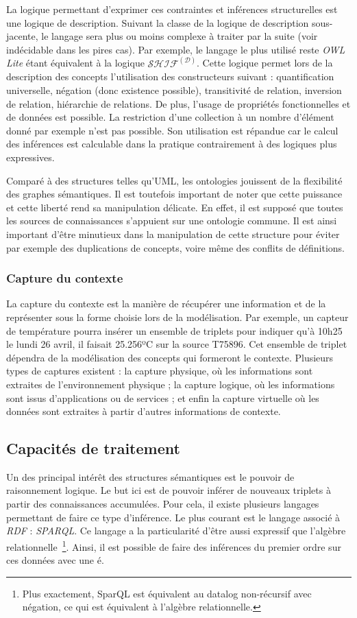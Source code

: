 La logique permettant d'exprimer ces contraintes et inférences structurelles est une logique de description. Suivant la classe de la logique de description sous-jacente, le langage sera plus ou moins complexe à traiter par la suite (voir indécidable dans les pires cas). Par exemple, le langage le plus utilisé reste \textit{OWL Lite} étant équivalent à la logique $\mathcal{SHIF}^\mathcal{(D)}$. Cette logique permet lors de la description des concepts l'utilisation des constructeurs suivant : quantification universelle, négation (donc existence possible), transitivité de relation, inversion de relation, hiérarchie de relations. De plus, l'usage de propriétés fonctionnelles et de données est possible. La restriction d'une collection à un nombre d'élément donné par exemple n'est pas possible. Son utilisation est répandue car le calcul des inférences est calculable dans la pratique contrairement à des logiques plus expressives.

Comparé à des structures telles qu'UML, les ontologies jouissent de la flexibilité des graphes sémantiques. Il est toutefois important de noter que cette puissance et cette liberté rend sa manipulation délicate. En effet, il est supposé que toutes les sources de connaissances s'appuient sur une ontologie commune. Il est ainsi important d'être minutieux dans la manipulation de cette structure pour éviter par exemple des duplications de concepts, voire même des conflits de définitions.

\subsubsection{Capture du contexte}
La capture du contexte est la manière de récupérer une information et de la représenter sous la forme choisie lors de la modélisation. Par exemple, un capteur de température pourra insérer un ensemble de triplets pour indiquer qu'à 10h25 le lundi 26 avril, il faisait 25.256ºC sur la source T75896. Cet ensemble de triplet dépendra de la modélisation des concepts qui formeront le contexte. Plusieurs types de captures existent : la capture physique, où les informations sont extraites de l'environnement physique ; la capture logique, où les informations sont issus d'applications ou de services ; et enfin la capture virtuelle où les données sont extraites à partir d'autres informations de contexte.

\subsection{Capacités de traitement}
Un des principal intérêt des structures sémantiques est le pouvoir de raisonnement logique. Le but ici est de pouvoir inférer de nouveaux triplets à partir des connaissances accumulées. Pour cela, il existe plusieurs langages permettant de faire ce type d'inférence. Le plus courant est le langage associé à \textit{RDF} : \textit{SPARQL}. Ce langage a la particularité d'être aussi expressif que l'algèbre relationnelle~\cite{Angles:sparql}\footnote{Plus exactement, SparQL est équivalent au datalog non-récursif avec négation, ce qui est équivalent à l'algèbre relationnelle.}. Ainsi, il est possible de faire des inférences du premier ordre sur ces données avec une é.

